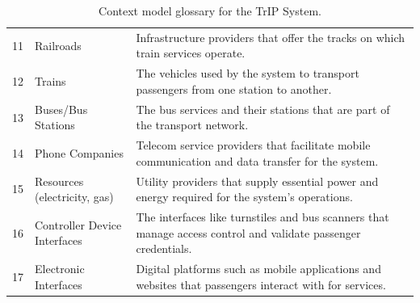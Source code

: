 \begin{table}[H]
\begin{tabular}{@{}clp{9cm}@{}}
11 & Railroads & Infrastructure providers that offer the tracks on which train services operate. \\
12 & Trains & The vehicles used by the system to transport passengers from one station to another. \\
13 & Buses/Bus Stations & The bus services and their stations that are part of the transport network. \\
14 & Phone Companies & Telecom service providers that facilitate mobile communication and data transfer for the system. \\
15 & Resources (electricity, gas) & Utility providers that supply essential power and energy required for the system’s operations. \\
16 & Controller Device Interfaces & The interfaces like turnstiles and bus scanners that manage access control and validate passenger credentials. \\
17 & Electronic Interfaces & Digital platforms such as mobile applications and websites that passengers interact with for services. \\
\bottomrule
\end{tabular}
\caption{Context model glossary for the TrIP System.}
\label{tab:glossary_context_view}
\end{table}
